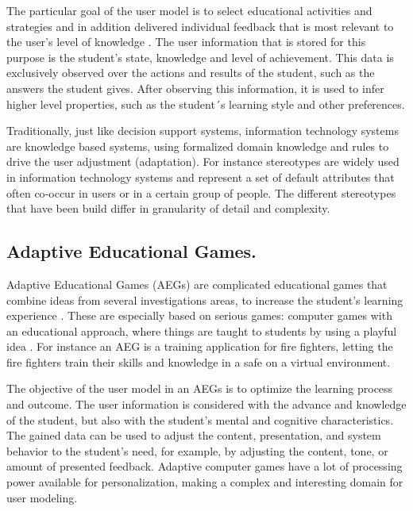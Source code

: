 The particular goal of the user model is to select educational activities and
strategies and in addition  delivered individual feedback that is most relevant
to the user’s level of knowledge \cite{kobsa2001generic} \cite{mctear1993user}. The user
information that is stored for this purpose is the student’s state, knowledge
and level of  achievement. This data is exclusively observed over the actions
and results of the student, such as the answers the student gives. After
observing this information, it is used to infer higher level  properties, such
as the student´s learning style and other preferences.

Traditionally, just like decision support systems, information technology
systems are knowledge based systems, using formalized domain  knowledge and
rules to drive the user adjustment (adaptation). For instance stereotypes are
widely used in information technology systems \cite{kay2012coming} and represent a set of
default attributes that often co‐occur in users or in a certain group of people.
The different stereotypes that have been build differ in granularity of detail
and complexity.


\subsection{Adaptive Educational Games.} 

Adaptive Educational Games (AEGs) are complicated educational games that combine
ideas from several investigations areas, to increase the student’s learning
experience \cite{peeters2012situated}. These are especially based on  serious
games: computer games with an educational approach, where things are taught to
students by using a  playful idea \cite{korteling2011transfer} \cite{johnson2005serious}. For instance an AEG is a training application  for fire fighters, letting
the fire fighters train their skills and knowledge in a safe on a virtual
environment.

The objective of the user model in an AEGs is to optimize the learning process
and outcome.   The user information is considered with the advance and knowledge
of the student, but also with the  student’s mental and cognitive
characteristics. The gained data can be used to adjust the content,
presentation, and system behavior to the  student’s need, for example, by
adjusting the content, tone, or amount of presented feedback. Adaptive computer
games have a lot of processing power available for personalization,  making a
complex and interesting domain for user modeling.

